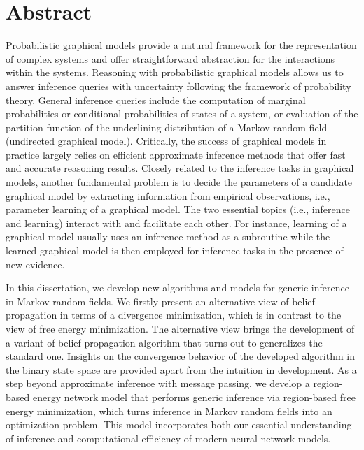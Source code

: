 \chapter{Abstract}
Probabilistic graphical models provide a natural framework for the representation of complex systems and offer straightforward abstraction for the interactions within the systems. Reasoning with probabilistic graphical models allows us to answer inference queries with uncertainty following the framework of probability theory. General inference queries include the computation of marginal probabilities or conditional probabilities of states of a system, or evaluation of the partition function of the underlining distribution of a Markov random field (undirected graphical model). Critically, the success of graphical models in practice largely relies on efficient approximate inference methods that offer fast and accurate reasoning results. Closely related to the inference tasks in graphical models, another fundamental problem is to decide the parameters of a candidate graphical model by extracting information from empirical observations, i.e., parameter learning of a graphical model. The two essential topics (i.e., inference and learning) interact with and facilitate each other. For instance, learning of a graphical model usually uses an inference method as a subroutine while the learned graphical model is then employed for inference tasks in the presence of new evidence.

In this dissertation, we develop new algorithms and models for generic inference in Markov random fields. We firstly present an alternative view of belief propagation in terms of a divergence minimization, which is in contrast to the view of free energy minimization. The alternative view brings the development of a variant of belief propagation algorithm that turns out to generalizes the standard one. Insights on the convergence behavior of the developed algorithm in the binary state space are provided apart from the intuition in development. As a step beyond approximate inference with message passing, we develop a region-based energy network model that performs generic inference via region-based free energy minimization, which turns inference in Markov random fields into an optimization problem. This model incorporates both our essential understanding of inference and computational efficiency of modern neural network models.

